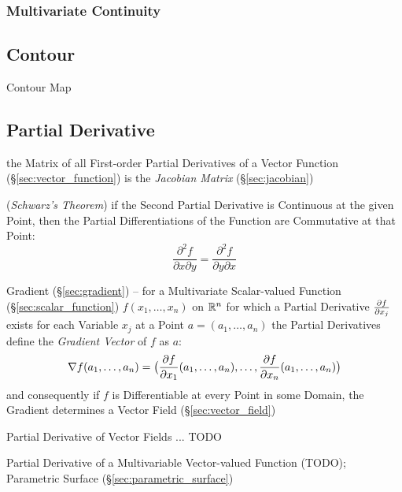 \subsubsection{Multivariate Continuity}\label{sec:multivariate_continuity}



\subsection{Contour}\label{sec:contour}

Contour Map



\subsection{Partial Derivative}\label{sec:partial_derivative}

the Matrix of all First-order Partial Derivatives of a Vector Function
(\S\ref{sec:vector_function}) is the \emph{Jacobian Matrix}
(\S\ref{sec:jacobian})

(\emph{Schwarz's Theorem}) if the Second Partial Derivative is Continuous at the
given Point, then the Partial Differentiations of the Function are Commutative
at that Point:
\[
  \frac{\partial^2f}{\partial{x}\partial{y}}
    = \frac{\partial^2f}{\partial{y}\partial{x}}
\]

Gradient (\S\ref{sec:gradient}) -- for a Multivariate Scalar-valued Function
(\S\ref{sec:scalar_function}) $f(x_1, \ldots, x_n)$ on $\mathbb{R}^n$ for which a
Partial Derivative $\frac{\partial{f}}{\partial{x_j}}$ exists for each Variable $x_j$ at a Point
$a = (a_1, \ldots, a_n)$ the Partial Derivatives define the \emph{Gradient
  Vector} of $f$ as $a$:
\[
  \nabla{f}(a_1, \ldots, a_n) = \big( \frac{\partial{f}}{\partial{x_1}}(a_1, \ldots, a_n), \ldots,
  \frac{\partial{f}}{\partial{x_n}}(a_1, \ldots, a_n) \big)
\]
and consequently if $f$ is Differentiable at every Point in some Domain, the
Gradient determines a Vector Field (\S\ref{sec:vector_field})

Partial Derivative of Vector Fields ... TODO

Partial Derivative of a Multivariable Vector-valued Function (TODO); Parametric
Surface (\S\ref{sec:parametric_surface})

